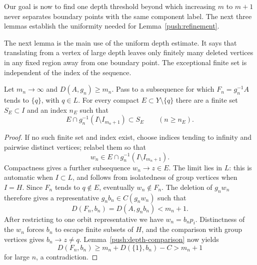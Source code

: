 Our goal is now to find one depth threshold beyond which increasing
$m$ to $m+1$ never separates boundary points with the same component
label. The next three lemmas establish the uniformity needed for
Lemma~\ref{push:refinement}.

The next lemma is the main use of the uniform depth estimate.
It says that translating from a vertex of large depth leaves only
finitely many deleted vertices in any fixed region away from one
boundary point.  The exceptional finite set is independent of the
index of the sequence.

\begin{lemma}\label{push:translated-deletions}
Let $m_n\to\infty$ and $D(A,g_n)\ge m_n$.
Pass to a subsequence for which $F_n=g_n^{-1}A$ tends to $\{q\}$,
with $q\in L$.
For every compact $E\subset Y\setminus\{q\}$ there are a finite
set $S_E\subset I$ and an index $n_E$ such that
\[
 E\cap g_n^{-1}(I\setminus I_{m_n+1})\subset S_E
 \qquad(n\ge n_E).
\]
\end{lemma}
\begin{proof}
If no such finite set and index exist, choose indices tending to infinity
and pairwise distinct vertices; relabel them so that
\[
 w_n\in E\cap g_n^{-1}(I\setminus I_{m_n+1}).
\]
Compactness gives a further subsequence $w_n\to z\in E$.
The limit lies in $L$: this is automatic when $I\subset L$, and follows
from isolatedness of group vertices when $I=H$.
Since $F_n$ tends to $q\notin E$, eventually $w_n\notin F_n$.
The deletion of $g_nw_n$ therefore gives a representative
$g_nb_n\in C(g_nw_n)$ such that
\[
 D(F_n,b_n)=D(A,g_nb_n)<m_n+1.
\]
After restricting to one orbit representative we have $w_n=b_np_i$.
Distinctness of the $w_n$ forces $b_n$ to escape finite subsets of $H$,
and the comparison with group vertices gives $b_n\to z\ne q$.
Lemma~\ref{push:depth-comparison} now yields
\[
 D(F_n,b_n)\ge m_n+D(\{1\},b_n)-C>m_n+1
\]
for large $n$, a contradiction.
\end{proof}

